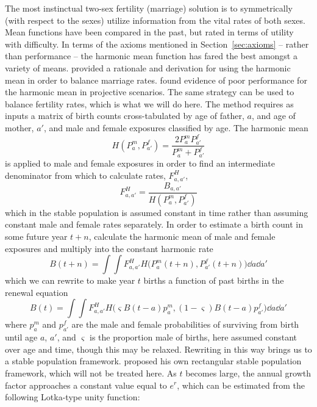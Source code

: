 The most instinctual two-sex fertility (marriage) solution is to symmetrically
(with respect to the sexes) utilize information from the vital rates of both
sexes. Mean functions have been compared in the past\citep[see
e.g.,][]{keyfitz1972mathematics}, but rated in terms of utility with difficulty.
In terms of the axioms mentioned in Section~\ref{sec:axioms} -- rather than
performance -- the harmonic mean function has fared the best amongst a variety
of means. \citet{schoen1978standardized, schoen1977two, schoen1981harmonic}
provided a rationale and derivation for using the harmonic mean in order to 
balance marriage rates. \citet{martcheva2001mathematics} found evidence of
poor performance for the harmonic mean in projective scenarios. The same
strategy can be used to balance fertility rates, which is what we will do here. 
The method requires as inputs a matrix of birth counts cross-tabulated by 
age of father, $a$, and age of mother, $a'$,
and male and female exposures classified by age. The harmonic mean
\begin{equation}
\label{eq:harmonic}
H(P_a^m, P_{a'}^f) = \frac{2 P_a^m P_{a'}^f}{P_a^m + P_{a'}^f}
\end{equation}
is applied to male and female exposures in order to find an intermediate
denominator from which to calculate rates, $F_{a,a'}^H$,
 \begin{equation}
 \label{eq:harmonicrate}
 F_{a,a'}^H = \frac{B_{a,a'}}{H(P_a^m, P_{a'}^f)}
 \end{equation}
which in the stable population is assumed constant in time rather than
assuming constant male and female rates separately. In order to estimate 
a birth count in some future year $t+n$, calculate the harmonic mean
of male and female exposures and multiply into the constant harmonic rate
 \begin{equation}
 B(t+n) = \int \int F_{a,a'}^H H\Big(P_{a}^m(t+n), P_{a'}^f(t+n)\Big) \dd a \dd
 a'
 \end{equation}
which we can rewrite to make year $t$ births a function of past births in the
renewal equation
 \begin{equation}
 B(t) = \int \int F_{a,a'}^H H\Big(\varsigma B(t-a)p_a^m, (1-\varsigma) B(t-a)
 p_{a'}^f\Big) \dd a
 \dd a'
 \end{equation}
where $p_a^m$ and $p_{a'}^f$ are the male and female probabilities of surviving
from birth until age $a$, $a'$, and $\varsigma$ is the proportion male of
births, here assumed constant over age and time, though this may be relaxed.
Rewriting in this way brings us to a stable population framework. \citet{schoen1977two} 
proposed his own rectangular stable population framework, which 
will not be treated here. As $t$ becomes large, the annual growth factor
approaches a constant value equal to $e^r$, which can be estimated from the
following Lotka-type unity function: 

